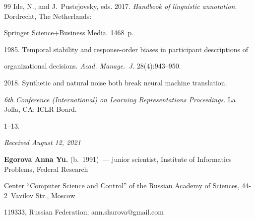 {{\begin{thebibliography}{99}
Ide, N., and J.~Pustejovsky, eds. 2017. \textit{Handbook of linguistic annotation}. Dordrecht, The Netherlands: 


Springer Science\;+\;Business Media. 1468~p.




 1985. Temporal stability and response-order biases in participant descriptions of 


organizational decisions. \textit{Acad. Manage.~J.} 28(4):943--950.




 2018. Synthetic and natural noise both break neural machine translation. 


\textit{6th Conference (International) on Learning Representations Proceedings}. La Jolla, CA: ICLR Board. 


1--13.


\end{thebibliography}


} }










\hfill{\small\textit{Received August 12, 2021}} 










\Contr





\noindent


\textbf{Egorova Anna Yu.} (b.\ 1991)~--- junior scientist, Institute of Informatics Problems, Federal Research 


Center ``Computer Science and Control'' of the Russian Academy of Sciences, 44-2~Vavilov Str., Moscow 


119333, Russian Federation; \mbox{ann.shurova@gmail.com}





\vspace*{3pt}





\noindent


